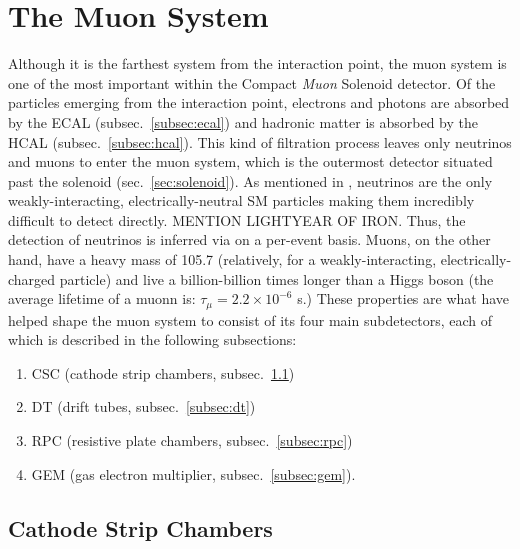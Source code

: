 \section{The Muon System}
\label{sec:muon_sys}

Although it is the farthest system from the interaction point, the muon system is one of the most important within the Compact \emph{Muon} Solenoid detector.
Of the particles emerging from the interaction point, electrons and photons are absorbed by the ECAL (subsec.~\ref{subsec:ecal}) and hadronic matter is absorbed by the HCAL (subsec.~\ref{subsec:hcal}).
This kind of filtration process leaves only neutrinos and muons to enter the muon system, which is the outermost detector situated past the solenoid (sec.~\ref{sec:solenoid}).
As mentioned in
, neutrinos are the only weakly-interacting, electrically-neutral SM particles making them incredibly difficult to detect directly.
MENTION LIGHTYEAR OF IRON.
Thus, the detection of neutrinos is inferred via \MET on a per-event basis.
Muons, on the other hand, have a heavy mass of 105.7 \MeV (relatively, for a weakly-interacting, electrically-charged particle) and live a billion-billion times longer than a Higgs boson (the average lifetime of a muonn is: $\tau_{\mu} = 2.2 \times 10^{-6}$ s.)
These properties are what have helped shape the muon system to consist of its four main subdetectors, each of which is described in the following subsections:
\begin{enumerate}
    \item CSC (cathode strip chambers, subsec.~\ref{subsec:csc})
    \item DT (drift tubes, subsec.~\ref{subsec:dt})
    \item RPC (resistive plate chambers, subsec.~\ref{subsec:rpc})
    \item GEM (gas electron multiplier, subsec.~\ref{subsec:gem}).
\end{enumerate}

\subsection{Cathode Strip Chambers}
\label{subsec:csc}

